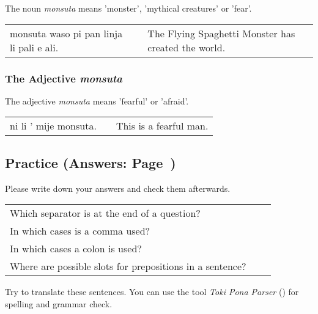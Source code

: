 The noun \textit{monsuta} means 'monster', 'mythical creatures' or 'fear'.

\begin{supertabular}{p{5,5cm}|ll}
monsuta waso pi pan linja li pali e ali. &&  The Flying Spaghetti Monster has created the world. \\
\end{supertabular}

%
\subsubsection*{The Adjective \textit{monsuta}}
%

The adjective \textit{monsuta} means 'fearful' or 'afraid'.

\begin{supertabular}{p{5,5cm}|ll}
ni li ' mije monsuta. && This is a fearful man. \\
\end{supertabular}

%
%
%
\newpage
%
\subsection*{Practice (Answers: Page~\pageref{'living_things'})}
%
Please write down your answers and check them afterwards. 

\begin{supertabular}{p{5,5cm}|ll}
Which separator is at the end of a question? &&  \\ %
In which cases is a comma used? &&  \\ %
In which cases a colon is used? &&  \\ %
Where are possible slots for prepositions in a sentence? &&  \\ %
\end{supertabular}

Try to translate these sentences. 
You can use the tool \textit{Toki Pona Parser} (\cite{www:rowa:02}) for spelling and grammar check. 

